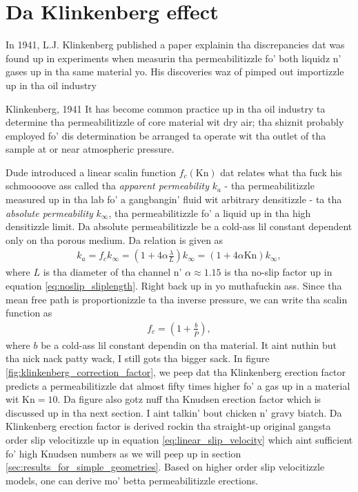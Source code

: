 \section{Da Klinkenberg effect}
In 1941, L.J. Klinkenberg published a paper explainin tha discrepancies dat was found up in experiments when measurin tha permeabilitizzle fo' both liquidz n' gases up in tha same material\cite{klinkenberg1941permeability} yo. His discoveries waz of pimped out importizzle up in tha oil industry
\begin{aquote}{Klinkenberg, 1941}
	It has become common practice up in tha oil industry ta determine tha permeabilitizzle of core material wit dry air; tha shiznit probably employed fo' dis determination be arranged ta operate wit tha outlet of tha sample at or near atmospheric pressure.
\end{aquote}
Dude introduced a linear scalin function $f_c(\text{Kn})$ dat relates what tha fuck his schmoooove ass called tha \textit{apparent permeability} $k_a$ - tha permeabilitizzle measured up in tha lab fo' a gangbangin' fluid wit arbitrary densitizzle - ta tha \textit{absolute permeability} $k_\infty$, tha permeabilitizzle fo' a liquid up in tha high densitizzle limit. Da absolute permeabilitizzle be a cold-ass lil constant dependent only on tha porous medium. Da relation is given as
\begin{align}
	k_a = f_c k_\infty = \left(1 + 4\alpha\frac{\lambda}{L}\right)k_\infty = \left(1 + 4\alpha\text{Kn}\right)k_\infty,
\end{align}
where $L$ is tha diameter of tha channel n' $\alpha\approx 1.15$ is tha no-slip factor up in equation \eqref{eq:noslip_sliplength}. Right back up in yo muthafuckin ass. Since tha mean free path is proportionizzle ta tha inverse pressure, we can write tha scalin function as
\begin{align}
	f_c = \left(1 + \frac{b}{\bar P}\right),
\end{align}
where $b$ be a cold-ass lil constant dependin on tha material. It aint nuthin but tha nick nack patty wack, I still gots tha bigger sack. In figure \ref{fig:klinkenberg_correction_factor}, we peep dat tha Klinkenberg erection factor predicts a permeabilitizzle dat almost fifty times higher fo' a gas up in a material wit $\text{Kn}=10$. Da figure also gotz nuff tha Knudsen erection factor which is discussed up in tha next section. I aint talkin' bout chicken n' gravy biatch. Da Klinkenberg erection factor is derived rockin tha straight-up original gangsta order slip velocitizzle up in equation \eqref{eq:linear_slip_velocity} which aint sufficient fo' high Knudsen numbers as we will peep up in section \ref{sec:results_for_simple_geometries}. Based on higher order slip velocitizzle models, one can derive mo' betta permeabilitizzle erections. 
